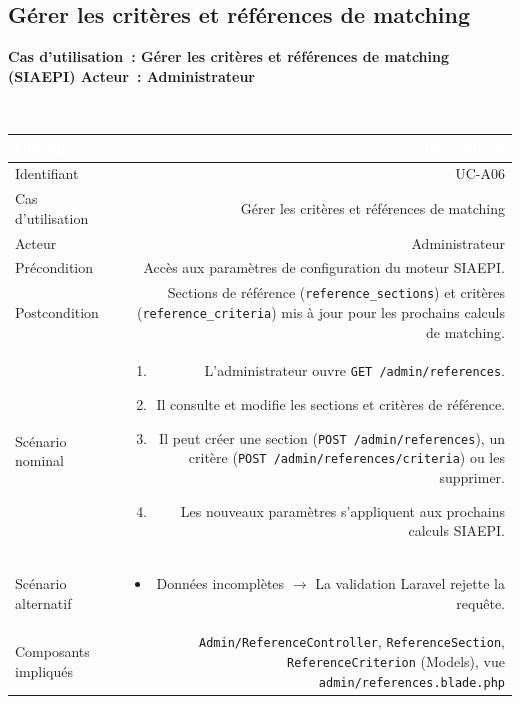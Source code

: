 \documentclass[a4paper,12pt]{article}
\newcommand{\ucheader}[2]{%
  \noindent\colorbox{capblue}{\parbox{\dimexpr\linewidth-2\fboxsep}{%
    \color{white}\bfseries\large Cas d'utilisation~: #1 \hfill \normalsize Acteur~: #2
  }}\\[2pt]
}
\begin{document}
\subsection{Gérer les critères et références de matching}
\ucheader{Gérer les critères et références de matching (SIAEPI)}{Administrateur}

\noindent
\begin{tabular}{|L|R|}
\hline
{}\textcolor{white}{\textbf{Champ}} & \textcolor{white}{\textbf{Description}} \\
\hline
{}Identifiant & UC-A06 \\
\hline
Cas d'utilisation & Gérer les critères et références de matching \\
\hline
{}Acteur & Administrateur \\
\hline
Précondition & Accès aux paramètres de configuration du moteur SIAEPI. \\
\hline
{}Postcondition & Sections de référence (\texttt{reference\_sections}) et critères (\texttt{reference\_criteria}) mis à jour pour les prochains calculs de matching. \\
\hline
Scénario nominal &
\begin{enumerate}
  \item L'administrateur ouvre \texttt{GET /admin/references}.
  \item Il consulte et modifie les sections et critères de référence.
  \item Il peut créer une section (\texttt{POST /admin/references}), un critère (\texttt{POST /admin/references/criteria}) ou les supprimer.
  \item Les nouveaux paramètres s'appliquent aux prochains calculs SIAEPI.
\end{enumerate} \\
\hline
{}Scénario alternatif &
\begin{itemize}
  \item Données incomplètes $\rightarrow$ La validation Laravel rejette la requête.
\end{itemize} \\
\hline
Composants impliqués & \texttt{Admin/ReferenceController}, \texttt{ReferenceSection}, \texttt{ReferenceCriterion} (Models), vue \texttt{admin/references.blade.php} \\
\hline
\end{tabular}
\end{document}
